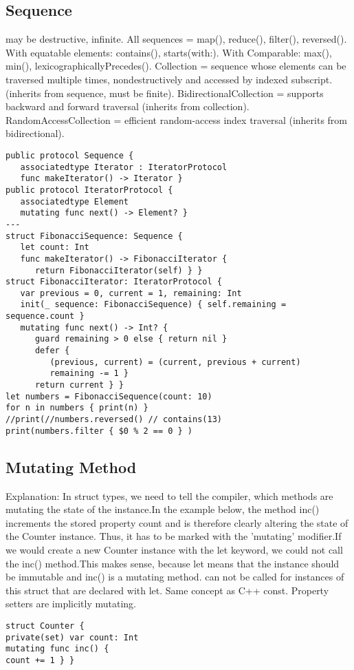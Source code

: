 \subsection{Sequence}
may be destructive, infinite. All sequences = map(), reduce(), filter(), reversed(). With equatable elements: contains(), starts(with:). With Comparable: max(), min(), lexicographicallyPrecedes(). Collection = sequence whose elements can be traversed multiple times, nondestructively and accessed by indexed subscript. (inherits from sequence, must be finite). BidirectionalCollection = supports backward and forward traversal (inherits from collection). RandomAccessCollection = efficient random-access index traversal (inherits from bidirectional).
\begin{lstlisting}
public protocol Sequence {
   associatedtype Iterator : IteratorProtocol
   func makeIterator() -> Iterator }
public protocol IteratorProtocol {
   associatedtype Element
   mutating func next() -> Element? }
---
struct FibonacciSequence: Sequence {
   let count: Int
   func makeIterator() -> FibonacciIterator {
      return FibonacciIterator(self) } }
struct FibonacciIterator: IteratorProtocol {
   var previous = 0, current = 1, remaining: Int
   init(_ sequence: FibonacciSequence) { self.remaining = sequence.count }
   mutating func next() -> Int? {
      guard remaining > 0 else { return nil }
      defer {
         (previous, current) = (current, previous + current)
         remaining -= 1 }
      return current } }
let numbers = FibonacciSequence(count: 10)
for n in numbers { print(n) }
//print(//numbers.reversed() // contains(13)
print(numbers.filter { $0 % 2 == 0 } )
\end{lstlisting}

\subsection{Mutating Method}
Explanation: In struct types, we need to tell the compiler, which methods are mutating the state of the instance.In the example below, the method inc() increments the stored property count and is therefore clearly altering the state of the Counter instance. Thus, it has to be marked with the 'mutating' modifier.If we would create a new Counter instance with the let keyword, we could not call the inc() method.This makes sense, because let means that the instance should be immutable and inc() is a mutating method.
can not be called for instances of this struct that are declared with let. Same concept as C++ const. Property setters are implicitly mutating.
\begin{lstlisting}
struct Counter {
private(set) var count: Int
mutating func inc() {
count += 1 } }
\end{lstlisting}

